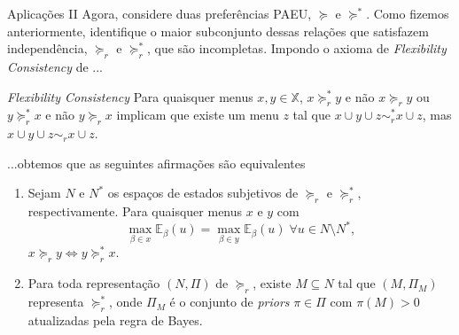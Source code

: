 \documentclass[11pt]{beamer}
\theoremstyle{nonumberplain}
\theoremstyle{plain}
\begin{document}
\begin{frame}{Aplicações II}
Agora, considere duas preferências PAEU, $\succcurlyeq$ e $\succcurlyeq^*$. Como fizemos anteriormente, identifique o maior subconjunto dessas relações que satisfazem independência, $\succcurlyeq_r$ e $\succcurlyeq^*_r$, que são incompletas. Impondo o axioma de \emph{Flexibility Consistency} de \cite{Moura2013}...
\begin{block}{\emph{Flexibility Consistency}}
Para quaisquer menus $x,y\in \mathbb{X}$, $x\succcurlyeq^*_r y$ e não $x\succcurlyeq_r y$ ou $y\succcurlyeq^*_r x$ e não $y\succcurlyeq_r x$ implicam que existe um menu $z$ tal que $x\cup y\cup z \sim^*_r x\cup z$, mas $x\cup y\cup z \sim_r x\cup z$.
\end{block} 
\end{frame}

\begin{frame}
...obtemos que as seguintes afirmações são equivalentes
\begin{enumerate}[1.]
\item Sejam $N$ e $N^*$ os espaços de estados subjetivos de $\succcurlyeq_r$ e $\succcurlyeq^*_r$, respectivamente. Para quaisquer menus $x$ e $y$ com 
$$\max_{\beta\in x}\mathbb{E}_\beta(u) = \max_{\beta\in y}\mathbb{E}_\beta(u)\;\forall u\in N\setminus N^*,$$
$x\succcurlyeq_r y \Leftrightarrow y\succcurlyeq^*_r x$.
\item Para toda representação $(N,\Pi)$ de $\succcurlyeq_r$, existe $M\subseteq N$ tal que $(M,\Pi_M)$ representa $\succcurlyeq_r^*$, onde $\Pi_M$ é o conjunto de \emph{priors} $\pi\in \Pi$ com $\pi(M)>0$ atualizadas pela regra de Bayes.
\end{enumerate} 
\end{frame}

\begin{frame}
\scriptsize


\end{frame}
\end{document}
